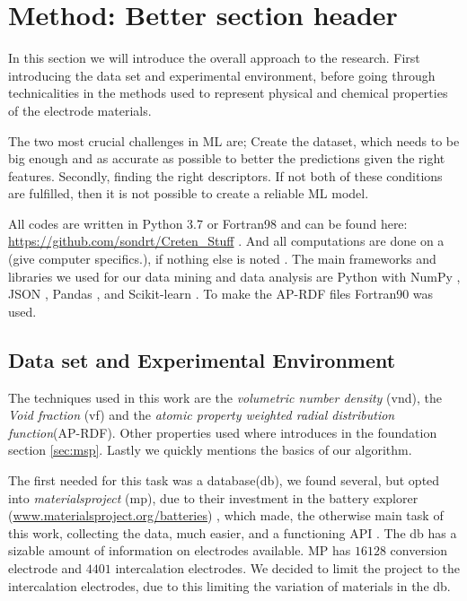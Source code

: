 \section{Method: Better section header}
	In this section we will introduce the overall approach to the research. First introducing the data set and experimental environment, before going through technicalities in the methods used to represent physical and chemical properties of the electrode materials.

	The two most crucial challenges in ML are; Create the dataset, which needs to be big enough and as accurate as possible to better the predictions given the right features. Secondly, finding the right descriptors. If not both of these conditions are fulfilled, then it is not possible to create a reliable ML model. 
	
	All codes are written in Python 3.7 \cite{van1995python} or Fortran98 \cite{backus1964fortran} and can be found here: \url{https://github.com/sondrt/Creten_Stuff} . And all computations are done on a (give computer specifics.), if nothing else is noted . The main frameworks and libraries we used for our data mining and data analysis are Python with NumPy \cite{oliphant2006guide}, JSON \cite{pezoa2016foundations}, Pandas \cite{mckinney-proc-scipy-2010}, and Scikit-learn \cite{scikit-learn}.
To make the AP-RDF files Fortran90 was used. 

\subsection{Data set and Experimental Environment}\label{sec:experimentalenv}

	 The techniques used in this work are the \textit{volumetric number density} (\ac{vnd}), the \textit{Void fraction} (\ac{vf}) and the \textit{atomic property weighted radial distribution function}(\ac{AP-RDF}). Other properties used where introduces in the foundation section \ref{sec:msp}. Lastly we quickly mentions the basics of our algorithm. 
 

	 The first needed for this task was a database(\ac{db}), we found several, but opted into \textit{materialsproject} \cite{Jain2013} \cite{doi:10.1038/sdata.2015.9} (mp), due to their investment in the battery explorer (\url{www.materialsproject.org/batteries}) \cite{Zhou2004a} \cite{Adams2011a}, which made, the otherwise main task of this work, collecting the data, much easier, and a functioning API \cite{Ong_2015}. The db has a sizable amount of information on electrodes available. MP has $16128$ conversion electrode and $4401$ intercalation electrodes. We decided to limit the project to the intercalation electrodes, due to this limiting the variation of materials in the db. 
	 
